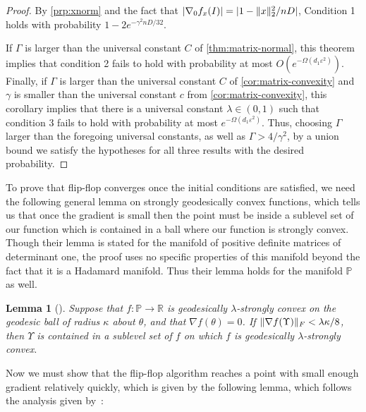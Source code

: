 \documentclass[aos]{imsart}
\newtheorem{lemma}[theorem]{Lemma}
\theoremstyle{definition}
\numberwithin{equation}{section}
\DeclarePairedDelimiter{\norm}{\lVert}{\rVert}
\newcommand{\R}{{\mathbb{R}}}
\newcommand{\eps}{\varepsilon}
\newcommand{\SPD}{\mathbb{P}}
\begin{document}
\begin{proof}
By \cref{prp:xnorm} and the fact that $|\nabla_0 f_x(I)| = |1 - \norm{x}_2^2/nD|$, Condition 1 holds with probability $1 - 2e^{-\gamma^2 nD/32}$.

If $\Gamma$ is larger than the universal constant $C$ of \cref{thm:matrix-normal}, this theorem implies that condition 2 fails to hold with probability at most $O(e^{-\Omega(d_1 \eps^2)})$.
Finally, if $\Gamma$ is larger than the universal constant $C$ of \cref{cor:matrix-convexity} and $\gamma$ is smaller than the universal constant $c$ from \cref{cor:matrix-convexity}, this corollary implies that there is a universal constant $\lambda \in (0,1)$ such that condition 3 fails to hold with probability at most $e^{-\Omega(d_1 \eps^2)}$.
Thus, choosing $\Gamma$ larger than the foregoing universal constants, as well as $\Gamma > 4/\gamma^2$, by a union bound we satisfy the hypotheses for all three results with the desired probability.
\end{proof}



To prove that flip-flop converges once the initial conditions are satisfied, we need the following general lemma \cite[Lemma 4.7]{FM20} on strongly geodesically convex functions, which tells us that once the gradient is small then the point must be inside a sublevel set of our function which is contained in a ball where our function is strongly convex. Though their lemma is stated for the manifold of positive definite matrices of determinant one, the proof uses no specific properties of this manifold beyond the fact that it is a Hadamard manifold. Thus their lemma holds for the manifold $\SPD$ as well.

\begin{lemma}[\cite{FM20}]\label{lem:gradient-strong-convexity-fm}
Suppose that $f : \SPD \to \R$ is geodesically $\lambda$-strongly convex on the geodesic ball of radius $\kappa$ about $\theta$, and that $\nabla f(\theta) = 0$.
If $\norm{\nabla f(\Upsilon)}_F < \lambda \kappa/8$, then $\Upsilon$ is contained in a sublevel set of $f$ on which $f$ is geodesically $\lambda$-strongly convex.
\end{lemma}
Now we must show that the flip-flop algorithm reaches a point with small enough gradient relatively quickly, which is given by the following lemma, which follows the analysis given by~\cite{GGOW19}:
\end{document}
